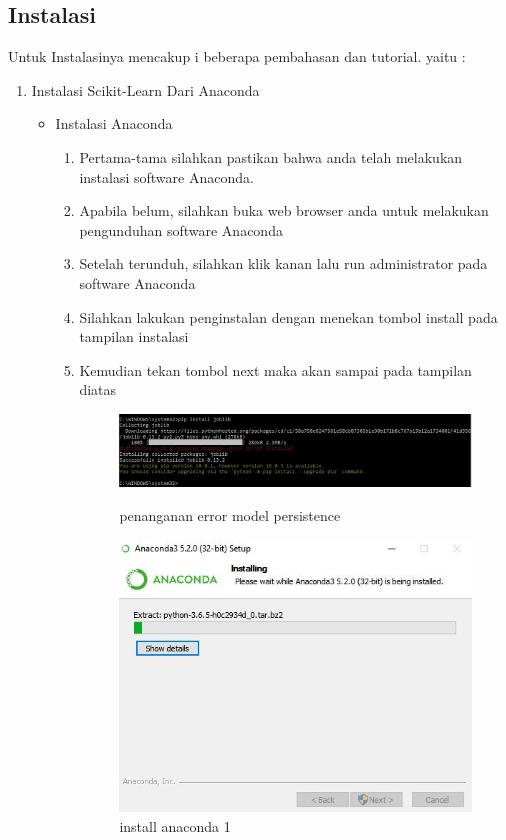 \subsection{Instalasi}
Untuk Instalasinya mencakup i beberapa pembahasan dan tutorial. yaitu :
\begin{enumerate}
\item Instalasi Scikit-Learn Dari Anaconda
\begin{itemize}
\item Instalasi Anaconda
\begin{enumerate}
\item Pertama-tama silahkan pastikan bahwa anda telah melakukan instalasi software Anaconda.
\item Apabila belum, silahkan buka web browser anda untuk melakukan pengunduhan software Anaconda
\item Setelah terunduh, silahkan klik kanan lalu run administrator pada software Anaconda
\item Silahkan lakukan penginstalan dengan menekan tombol install pada tampilan instalasi
\item Kemudian tekan tombol next maka akan sampai pada tampilan diatas

\par

\begin{figure}[ht]
\centering
\includegraphics[scale=0.4]{figures/penanganan1.jpg}
\caption{penanganan error model persistence }
\includegraphics[scale=0.5]{figures/ana1.JPG}
\caption{install anaconda 1}
\label{contoh}
\end{figure}

\par
\end{enumerate}
\end{itemize}
\end{enumerate}

